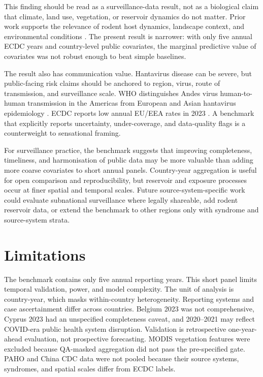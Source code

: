 \documentclass[11pt]{article}
\begin{document}
This finding should be read as a surveillance-data result, not as a biological claim that climate, land use, vegetation, or reservoir dynamics do not matter. Prior work supports the relevance of rodent host dynamics, landscape context, and environmental conditions \cite{kallio_2009,reusken_heyman_2013,zeimes_2015,kazasidis_2024}. The present result is narrower: with only five annual ECDC years and country-level public covariates, the marginal predictive value of covariates was not robust enough to beat simple baselines.

The result also has communication value. Hantavirus disease can be severe, but public-facing risk claims should be anchored to region, virus, route of transmission, and surveillance scale. WHO distinguishes Andes virus human-to-human transmission in the Americas from European and Asian hantavirus epidemiology \cite{who_hantavirus_2026}. ECDC reports low annual EU/EEA rates in 2023 \cite{ecdc_2023_hantavirus}. A benchmark that explicitly reports uncertainty, under-coverage, and data-quality flags is a counterweight to sensational framing.

For surveillance practice, the benchmark suggests that improving completeness, timeliness, and harmonisation of public data may be more valuable than adding more coarse covariates to short annual panels. Country-year aggregation is useful for open comparison and reproducibility, but reservoir and exposure processes occur at finer spatial and temporal scales. Future source-system-specific work could evaluate subnational surveillance where legally shareable, add rodent reservoir data, or extend the benchmark to other regions only with syndrome and source-system strata.

\section{Limitations}

The benchmark contains only five annual reporting years. This short panel limits temporal validation, power, and model complexity. The unit of analysis is country-year, which masks within-country heterogeneity. Reporting systems and case ascertainment differ across countries. Belgium 2023 was not comprehensive, Cyprus 2023 had an unspecified completeness caveat, and 2020--2021 may reflect COVID-era public health system disruption. Validation is retrospective one-year-ahead evaluation, not prospective forecasting. MODIS vegetation features were excluded because QA-masked aggregation did not pass the pre-specified gate. PAHO and China CDC data were not pooled because their source systems, syndromes, and spatial scales differ from ECDC labels.
\end{document}
